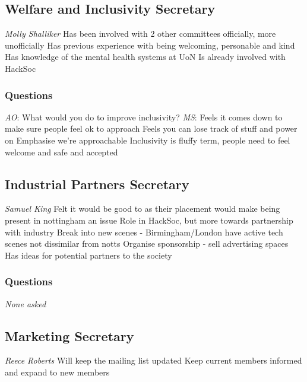 \documentclass[11pt]{meetingmins}
\begin{document}
\subsection{Welfare and Inclusivity Secretary}
\begin{items}
	\item
	\textit{Molly Shalliker}
		\subitem
		Has been involved with 2 other committees officially, more unofficially
		\subitem
		Has previous experience with being welcoming, personable and kind
		\subitem
		Has knowledge of the mental health systems at UoN
		\subitem
		Is already involved with HackSoc	
\end{items}

\subsubsection{Questions}
\begin{items}
	\item
	\textit{AO}: What would you do to improve inclusivity?
		\subitem
		\textit{MS}:
			\subsubitem
			Feels it comes down to make sure people feel ok to approach
			\subsubitem
			Feels you can lose track of stuff and power on
			\subsubitem
			Emphasise we're approachable
			\subsubitem
			Inclusivity is fluffy term, people need to feel welcome and safe and accepted
\end{items}


\subsection{Industrial Partners Secretary}
\begin{items}
	\item
	\textit{Samuel King}
		\subitem
		Felt it would be good to as their placement would make being present in nottingham an issue
		\subitem
		Role in HackSoc, but more towards partnership with industry
		\subitem
		Break into new scenes - Birmingham/London have active tech scenes not dissimilar from notts
		\subitem
		Organise sponsorship - sell advertising spaces
		\subitem
		Has ideas for potential partners to the society
\end{items}

\subsubsection{Questions}
\textit{None asked}

\subsection{Marketing Secretary}
\begin{items}
	\item
	\textit{Reece Roberts}
		\subitem
		Will keep the mailing list updated
		\subitem
		Keep current members informed and expand to new members
\end{items}
\end{document}
